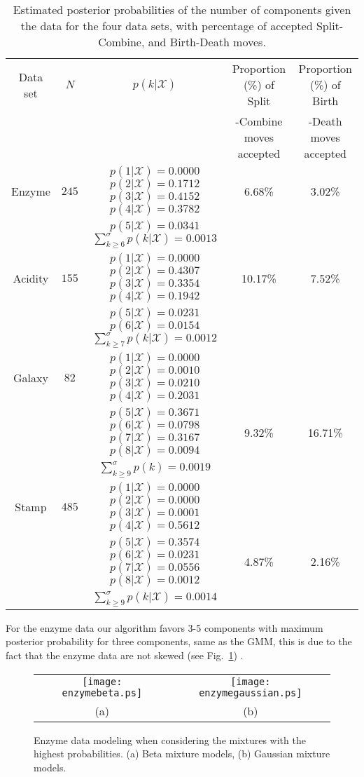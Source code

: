 \documentclass[journal,10pt]{elsart}
\begin{document}
\begin{table}[ht!]
\begin{center}
\caption{Estimated posterior probabilities of the number of components given the data for the four data sets, with percentage of accepted Split-Combine, and Birth-Death moves.\label{tab3}}
\tiny
\begin{tabular}{|c| c| c| c| c| }
  \hline
Data set&$N$ &$p(k|\mathcal{X})$ & Proportion (\%) of Split &  Proportion (\%) of Birth\\
&&&-Combine moves accepted&-Death moves accepted\\
\hline
Enzyme &$245$ & $p(1|\mathcal{X})=0.0000$ $p(2|\mathcal{X})=0.1712$ $p(3|\mathcal{X})=0.4152$ $p(4|\mathcal{X})=0.3782$ &6.68\%&3.02\% \\
&& $p(5|\mathcal{X})=0.0341$ $\sum_{{k}\geq{6}}^{\sigma}p(k|\mathcal{X})=0.0013$ &&\\
\hline
Acidity &$155$ & $p(1|\mathcal{X})=0.0000$ $p(2|\mathcal{X})=0.4307$ $p(3|\mathcal{X})=0.3354$ $p(4|\mathcal{X})=0.1942$ &10.17\%&7.52\% \\
&& $p(5|\mathcal{X})=0.0231$$p(6|\mathcal{X})=0.0154$ $\sum_{{k}\geq{7}}^{\sigma}p(k|\mathcal{X})=0.0012$&&\\
 \hline
Galaxy &$82$ &$p(1|\mathcal{X})=0.0000$ $p(2|\mathcal{X})=0.0010$ $p(3|\mathcal{X})=0.0210$ $p(4|\mathcal{X})=0.2031$ && \\
&& $p(5|\mathcal{X})=0.3671$$p(6|\mathcal{X})=0.0798$ $p(7|\mathcal{X})=0.3167$ $p(8|\mathcal{X})=0.0094$ & 9.32\%& 16.71\%\\
&& $\sum_{{k}\geq{9}}^{\sigma}p(k)=0.0019$&&\\
  \hline
Stamp &$485$& $p(1|\mathcal{X})=0.0000$ $p(2|\mathcal{X})=0.0000$ $p(3|\mathcal{X})=0.0001$ $p(4|\mathcal{X})=0.5612$ && \\
&& $p(5|\mathcal{X})=0.3574$$p(6|\mathcal{X})=0.0231$ $p(7|\mathcal{X})=0.0556$ $p(8|\mathcal{X})=0.0012$ &4.87\%&2.16\%\\
&& $\sum_{{k}\geq{9}}^{\sigma}p(k|\mathcal{X})=0.0014$ &&\\
  \hline
\end{tabular}
\end{center}
\end{table}
For the enzyme data our algorithm favors 3-5 components with maximum posterior probability for three components, same as the GMM, this is due to the fact that the enzyme data are not skewed (see Fig.~\ref{fig:4}) .
\begin{figure}[!h]
\begin{center}
\begin{tabular}{c c}
\texttt{[image: enzymebeta.ps]}&\texttt{[image: enzymegaussian.ps]}\\
(a)&(b)
\end{tabular}
\end{center}
\caption{Enzyme data modeling when considering the mixtures with the highest probabilities. (a) Beta mixture models, (b) Gaussian mixture models.\label{fig:4}}
\end{figure}
\end{document}
